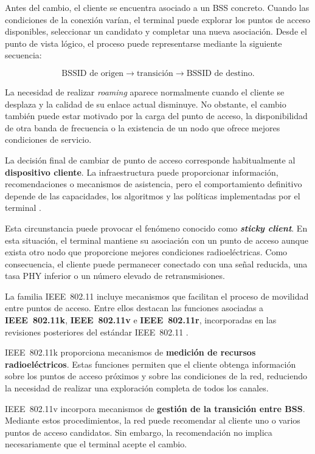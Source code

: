 Antes del cambio, el cliente se encuentra asociado a un BSS concreto.
Cuando las condiciones de la conexión varían, el terminal puede explorar
los puntos de acceso disponibles, seleccionar un candidato y completar
una nueva asociación. Desde el punto de vista lógico, el proceso puede
representarse mediante la siguiente secuencia:

\[
    \text{BSSID de origen}
    \longrightarrow
    \text{transición}
    \longrightarrow
    \text{BSSID de destino}.
\]

La necesidad de realizar \textit{roaming} aparece normalmente cuando el
cliente se desplaza y la calidad de su enlace actual disminuye. No
obstante, el cambio también puede estar motivado por la carga del punto de
acceso, la disponibilidad de otra banda de frecuencia o la existencia de
un nodo que ofrece mejores condiciones de servicio.

La decisión final de cambiar de punto de acceso corresponde
habitualmente al \textbf{dispositivo cliente}. La infraestructura puede
proporcionar información, recomendaciones o mecanismos de asistencia,
pero el comportamiento definitivo depende de las capacidades, los
algoritmos y las políticas implementadas por el terminal
\cite{ieee_80211_2024}.

Esta circunstancia puede provocar el fenómeno conocido como
\textbf{\textit{sticky client}}. En esta situación, el terminal mantiene
su asociación con un punto de acceso aunque exista otro nodo que
proporcione mejores condiciones radioeléctricas. Como consecuencia, el
cliente puede permanecer conectado con una señal reducida, una tasa PHY
inferior o un número elevado de retransmisiones.

La familia IEEE~802.11 incluye mecanismos que facilitan el proceso de
movilidad entre puntos de acceso. Entre ellos destacan las funciones
asociadas a \textbf{IEEE~802.11k}, \textbf{IEEE~802.11v} e
\textbf{IEEE~802.11r}, incorporadas en las revisiones posteriores del
estándar IEEE~802.11 \cite{ieee_80211_2024}.

IEEE~802.11k proporciona mecanismos de
\textbf{medición de recursos radioeléctricos}. Estas funciones permiten
que el cliente obtenga información sobre los puntos de acceso próximos y
sobre las condiciones de la red, reduciendo la necesidad de realizar una
exploración completa de todos los canales.

IEEE~802.11v incorpora mecanismos de
\textbf{gestión de la transición entre BSS}. Mediante estos
procedimientos, la red puede recomendar al cliente uno o varios puntos de
acceso candidatos. Sin embargo, la recomendación no implica
necesariamente que el terminal acepte el cambio.

